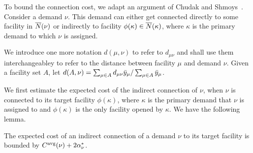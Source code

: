 To bound the connection cost, we adapt an argument of Chudak
and Shmoys~\cite{ChudakS04}. Consider a demand $\nu$. This
demand can either get connected directly to some facility in
${\overline{N}}(\nu)$ or indirectly to facility $\phi(\kappa)\in
{\overline{N}}(\kappa)$, where $\kappa$ is the primary demand to
which $\nu$ is assigned.

We introduce one more notation $d(\mu,\nu)$ to refer to
$d_{\mu\nu}$ and shall use them interchangeabley to refer to
the distance between facility $\mu$ and demand $\nu$. Given
a facility set $A$, let $d(A,\nu)=\sum_{\mu\in A}
d_{\mu\nu}{\bar y}_{\mu}/\sum_{\mu\in A} {\bar y}_{\mu}$.

We first estimate the expected cost of the indirect
connection of $\nu$, when $\nu$ is connected to its target
facility $\phi(\kappa)$, where $\kappa$ is the primary
demand that $\nu$ is assigned to and $\phi(\kappa)$ is the
only facility opened by $\kappa$. We have the following
lemma.
\begin{lemma}
  \label{lem:echu indirect}
  The expected cost of an indirect connection of a demand
  $\nu$ to its target facility is bounded by
  $C^{{\mbox{\scriptsize\rm avg}}}(\nu)+2\alpha_{\nu}^\ast$.
\end{lemma}
